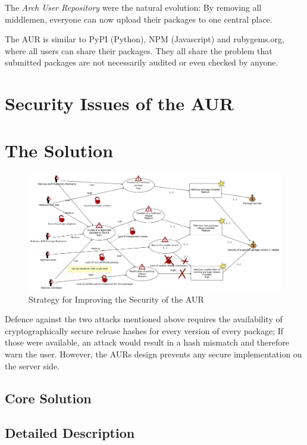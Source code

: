 \documentclass{scrartcl}
\begin{document}
  The \emph{Arch User Repository} were the natural evolution: By removing all middlemen, everyone can now upload their packages to one central place. \cite{wiki:AUR}

  The AUR is similar to PyPI (Python), NPM (Javascript) and rubygems.org, where all users can share their packages. They all share the problem that submitted packages are not necessarily audited or even checked by anyone.

  \section{Security Issues of the AUR} %

  \section{The Solution} %
    \begin{figure}
      \includegraphics[width=\textwidth,trim={0 0 245 0},clip]{img/threat2.png}
      \caption[Threat Prevention Strategy]{Strategy for Improving the Security of the AUR}
      \label{fig:threat2}
    \end{figure}

    Defence against the two attacks mentioned above requires the availability of cryptographically secure release hashes for every version of every package; If those were available, an attack would result in a hash mismatch and therefore warn the user. However, the AURs design prevents any secure implementation on the server side.

    \subsection{Core Solution}  %
    \subsection{Detailed Description} %
\end{document}

